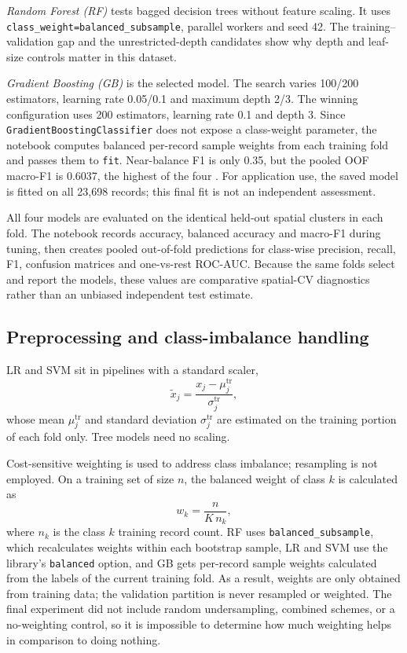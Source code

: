 \documentclass[conference]{IEEEtran}
\begin{document}
\emph{Random Forest (RF)} tests bagged decision trees without feature scaling. It uses \texttt{class\_weight=balanced\_subsample}, parallel workers and seed 42. The training--validation gap and the unrestricted-depth candidates show why depth and leaf-size controls matter in this dataset.

\emph{Gradient Boosting (GB)} is the selected model. The search varies 100/200 estimators, learning rate 0.05/0.1 and maximum depth 2/3. The winning configuration uses 200 estimators, learning rate 0.1 and depth 3. Since \texttt{GradientBoostingClassifier} does not expose a class-weight parameter, the notebook computes balanced per-record sample weights from each training fold and passes them to \texttt{fit}. Near-balance F1 is only 0.35, but the pooled OOF macro-F1 is 0.6037, the highest of the four \cite{friedman2001}. For application use, the saved model is fitted on all 23,698 records; this final fit is not an independent assessment.

All four models are evaluated on the identical held-out spatial clusters in each fold. The notebook records accuracy, balanced accuracy and macro-F1 during tuning, then creates pooled out-of-fold predictions for class-wise precision, recall, F1, confusion matrices and one-vs-rest ROC-AUC. Because the same folds select and report the models, these values are comparative spatial-CV diagnostics rather than an unbiased independent test estimate.

\subsection{Preprocessing and class-imbalance handling}
LR and SVM sit in pipelines with a standard scaler,
\begin{equation}
\tilde x_{j}=\frac{x_{j}-\mu_{j}^{\text{tr}}}{\sigma_{j}^{\text{tr}}},
\label{eq:scale}
\end{equation}
whose mean $\mu_j^{\text{tr}}$ and standard deviation $\sigma_j^{\text{tr}}$ are estimated on the training portion of each fold only. Tree models need no scaling.

Cost-sensitive weighting is used to address class imbalance; resampling is not employed. On a training set of size $n$, the balanced weight of class $k$ is calculated as
\begin{equation}
w_k=\frac{n}{K\,n_k},
\label{eq:cw}
\end{equation}
where $n_k$ is the class $k$ training record count. RF uses \texttt{balanced\_subsample}, which recalculates weights within each bootstrap sample, LR and SVM use the library's \texttt{balanced} option, and GB gets per-record sample weights calculated from the labels of the current training fold. As a result, weights are only obtained from training data; the validation partition is never resampled or weighted. The final experiment did not include random undersampling, combined schemes, or a no-weighting control, so it is impossible to determine how much weighting helps in comparison to doing nothing.
\end{document}
